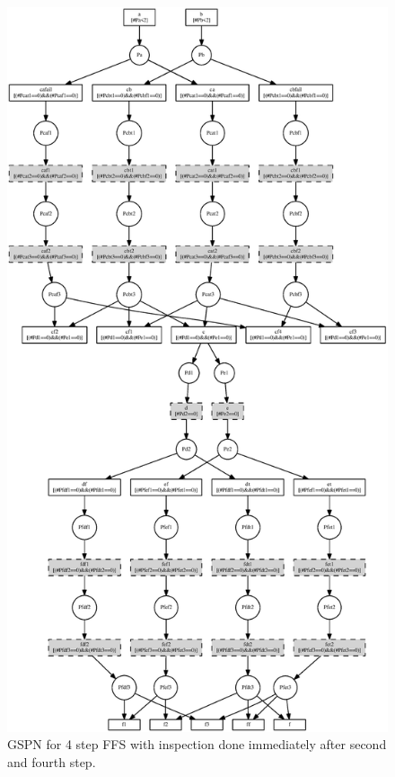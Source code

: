 \begin{figure}[p]
\begin{center}
	\includegraphics[height=\vsize]{fig/2a-4a.eps}
\end{center}
\caption{GSPN for 4 step FFS with inspection done immediately after second and fourth step.}
\label{fig:ffs24}
\end{figure}

